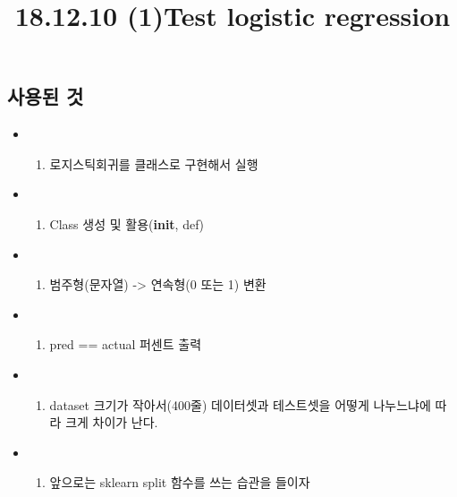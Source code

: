 \documentclass[11pt]{article}
\title{18.12.10 (1)Test logistic regression}
\providecommand{\tightlist}{%
      \setlength{\itemsep}{0pt}\setlength{\parskip}{0pt}}
\begin{document}
    
    
    \maketitle
    
    

    
    \subsection{사용된 것}\label{uxc0acuxc6a9uxb41c-uxac83}

\begin{itemize}
\item
  \begin{enumerate}
  \def\labelenumi{\arabic{enumi}.}
  \setcounter{enumi}{-1}
  \tightlist
  \item
    로지스틱회귀를 클래스로 구현해서 실행
  \end{enumerate}
\item
  \begin{enumerate}
  \def\labelenumi{\arabic{enumi}.}
  \tightlist
  \item
    Class 생성 및 활용(\textbf{init}, def)
  \end{enumerate}
\item
  \begin{enumerate}
  \def\labelenumi{\arabic{enumi}.}
  \setcounter{enumi}{1}
  \tightlist
  \item
    범주형(문자열) -\textgreater{} 연속형(0 또는 1) 변환
  \end{enumerate}
\item
  \begin{enumerate}
  \def\labelenumi{\arabic{enumi}.}
  \setcounter{enumi}{2}
  \tightlist
  \item
    pred == actual 퍼센트 출력
  \end{enumerate}
\item
  \begin{enumerate}
  \def\labelenumi{\arabic{enumi}.}
  \setcounter{enumi}{3}
  \tightlist
  \item
    dataset 크기가 작아서(400줄) 데이터셋과 테스트셋을 어떻게 나누느냐에
    따라 크게 차이가 난다.
  \end{enumerate}
\item
  \begin{enumerate}
  \def\labelenumi{\arabic{enumi}.}
  \setcounter{enumi}{4}
  \tightlist
  \item
    앞으로는 sklearn split 함수를 쓰는 습관을 들이자
  \end{enumerate}
\end{itemize}
\end{document}
